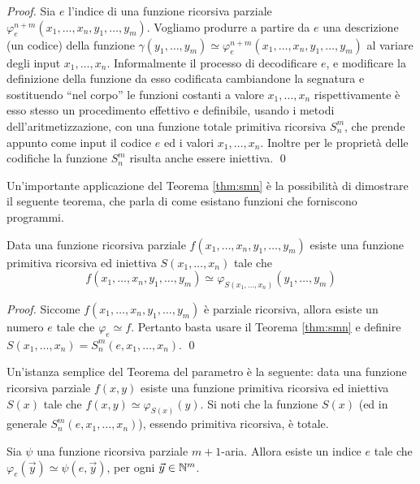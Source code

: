 \documentclass[runningheads,a4paper]{llncs}
\begin{document}
\begin{proof}
Sia $e$ l'indice di una funzione ricorsiva parziale $\varphi_e^{n+m}(x_1,\ldots,x_n,y_1,\ldots,y_m)$. Vogliamo produrre a partire da $e$
 una descrizione (un codice) della funzione $\gamma(y_1,\ldots,y_m) \simeq \varphi_e^{n+m}(x_1,\ldots,x_n,y_1,\ldots,y_m)$ al variare
 degli input $x_1,\ldots,x_n$. Informalmente il processo di decodificare $e$, e modificare la definizione della funzione da 
 esso codificata cambiandone la segnatura e sostituendo ``nel corpo'' le funzioni costanti a valore $x_1,\ldots,x_n$ rispettivamente
 \`{e} esso stesso un procedimento effettivo e definibile, usando i metodi dell'aritmetizzazione, con una funzione totale primitiva ricorsiva
 $S_n^m$, che prende appunto come input il codice $e$ ed i valori $x_1,\ldots,x_n$. Inoltre per le propriet\`{a} delle codifiche
 la funzione $S_n^m$ risulta anche essere iniettiva.
\qed\end{proof}

Un'importante applicazione del Teorema \ref{thm:smn} \`{e} la possibilit\`{a} di dimostrare il seguente teorema, che parla di come 
 esistano funzioni che forniscono programmi.

\begin{theorem}\label{thm:parametro}
Data una funzione ricorsiva parziale $f(x_1,\ldots,x_n,y_1,\ldots,y_m)$ esiste una funzione primitiva ricorsiva ed iniettiva
 $S(x_1,\ldots,x_n)$ tale che
 $$ f(x_1,\ldots,x_n,y_1,\ldots,y_m)\simeq\varphi_{S(x_1,\ldots,x_n)}(y_1,\ldots,y_m)$$
\end{theorem}

\begin{proof}
Siccome $f(x_1,\ldots,x_n,y_1,\ldots,y_m)$ \`{e} parziale ricorsiva, allora esiste un numero $e$ tale che
 $\varphi_e \simeq f$. Pertanto basta usare il Teorema \ref{thm:smn} e definire $S(x_1,\ldots,x_n) = S_n^m(e,x_1,\ldots,x_n)$.
\qed\end{proof}

Un'istanza semplice del Teorema del parametro \`{e} la seguente: data una funzione ricorsiva parziale $f(x,y)$ esiste una funzione
 primitiva ricorsiva ed iniettiva $S(x)$ tale che $f(x,y)\simeq\varphi_{S(x)}(y)$. Si noti che la funzione $S(x)$
 (ed in generale $S_n^m(e,x_1,\ldots,x_n)$), essendo primitiva ricorsiva, \`{e} totale.

\begin{theorem}[di ricorsione II]\label{thm:second-recursion}
Sia $\psi$ una funzione ricorsiva parziale $m+1$-aria. Allora esiste un indice $e$ tale che $\varphi_{e}(\vec y) \simeq \psi(e,\vec y)$, per ogni
 $\vec y \in \mathbb{N}^m$.
\end{theorem}
\end{document}
